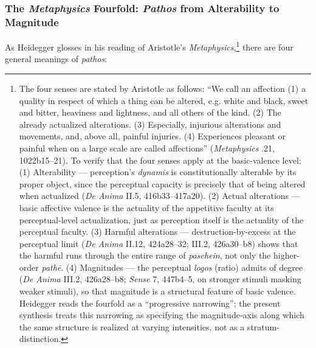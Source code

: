 \subsubsection{The \textit{Metaphysics} Fourfold: \textit{Pathos} from Alterability to Magnitude}

As Heidegger glosses in his reading of Aristotle's \textit{Metaphysics},\footnote{The four senses are stated by Aristotle as follows: ``We call an affection (1) a quality in respect of which a thing can be altered, e.g. white and black, sweet and bitter, heaviness and lightness, and all others of the kind. (2) The already actualized alterations. (3) Especially, injurious alterations and movements, and, above all, painful injuries. (4) Experiences pleasant or painful when on a large scale are called affections'' (\textit{Metaphysics} .21, 1022b15--21). To verify that the four senses apply at the basic-valence level: (1) Alterability --- perception's \textit{dynamis} is constitutionally alterable by its proper object, since the perceptual capacity is precisely that of being altered when actualized (\textit{De Anima} II.5, 416b33--417a20). (2) Actual alterations --- basic affective valence is the actuality of the appetitive faculty at its perceptual-level actualization, just as perception itself is the actuality of the perceptual faculty. (3) Harmful alterations --- destruction-by-excess at the perceptual limit (\textit{De Anima} II.12, 424a28--32; III.2, 426a30--b8) shows that the harmful runs through the entire range of \textit{paschein}, not only the higher-order \textit{pathē}. (4) Magnitudes --- the perceptual \textit{logos} (ratio) admits of degree (\textit{De Anima} III.2, 426a28--b8; \textit{Sense} 7, 447b4--5, on stronger stimuli masking weaker stimuli), so that magnitude is a structural feature of basic valence. Heidegger reads the fourfold as a ``progressive narrowing''; the present synthesis treats this narrowing as specifying the magnitude-axis along which the same structure is realized at varying intensities, not as a stratum-distinction.} there are four general meanings of \textit{pathos}:
